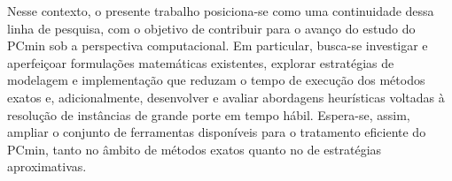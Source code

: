Nesse contexto, o presente trabalho posiciona-se como uma continuidade dessa linha de pesquisa, com o objetivo de contribuir para o avanço do estudo do PCmin sob a perspectiva computacional. Em particular, busca-se investigar e aperfeiçoar formulações matemáticas existentes, explorar estratégias de modelagem e implementação que reduzam o tempo de execução dos métodos exatos e, adicionalmente, desenvolver e avaliar abordagens heurísticas voltadas à resolução de instâncias de grande porte em tempo hábil. Espera-se, assim, ampliar o conjunto de ferramentas disponíveis para o tratamento eficiente do PCmin, tanto no âmbito de métodos exatos quanto no de estratégias aproximativas.